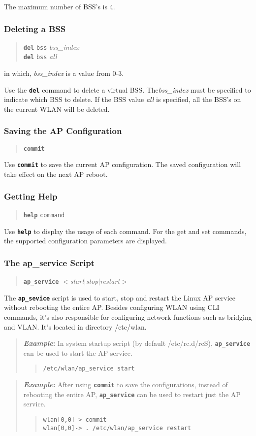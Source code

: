 \documentclass[10pt,fullpage]{article}
\newcommand{\mytt}[1]{{\texttt{#1}}}
\newcommand{\bv}{\begin{verse}}
\newcommand{\ev}{\end{verse}}
\newcommand{\clicmd}[1]{{\textbf{\texttt{#1}}}}
\newcommand{\cliparam}[1]{{\texttt{#1}}}
\newcommand{\clival}[1]{{\emph{#1}}}
\newcommand{\clidemo}[1]{{\texttt{wlan[0,0]-> #1}}}
\newenvironment{example}{\begin{quote}\textbf{\textit{Example}:}}{\end{quote}}
\begin{document}
The maximum number of BSS's is 4. 

\subsubsection{Deleting a BSS}
\bv
\clicmd{del} \cliparam{bss} \clival{bss\_index}\\
\clicmd{del} \cliparam{bss} \clival{all}
\ev
in which, \clival{bss\_index} is a value from 0-3.

Use the \clicmd{del} command to delete a virtual BSS.
The\clival{bss\_index} must be specified to indicate which BSS to
delete.  If the BSS value \clival{all} is specified, all the BSS's on
the current WLAN will be deleted.

\subsubsection{Saving the AP Configuration}
\bv
\clicmd{commit}
\ev
Use \clicmd{commit} to save the current AP configuration. 
The saved configuration will take effect on the next AP reboot.

\subsubsection{Getting Help}
\bv
\clicmd{help} \cliparam{command}
\ev
Use \clicmd{help} to display the usage of each command.  For the get
and set commands, the supported configuration parameters are
displayed.

\subsubsection{The ap\_service Script}
\bv
\clicmd{ap\_service} $<$\clival{start}$|$\clival{stop}$|$\clival{restart}$>$
\ev
The \clicmd{ap\_sevice} script is used to start, stop and restart the
Linux AP service without rebooting the entire AP. Besides configuring
WLAN using CLI commands, it's also responsible for configuring
network functions such as bridging and VLAN.
It's located in directory /etc/wlan.

\begin{example}
  In system startup script (by default /etc/rc.d/rcS), \clicmd{ap\_service}
  can be used to start the AP service.
  \bv
  \mytt{/etc/wlan/ap\_service start}
  \ev
\end{example}

\begin{example}
  After using \clicmd{commit} to save the configurations, instead of rebooting
  the entire AP, \clicmd{ap\_service} can be used to restart just the AP service.
  \bv
  \clidemo{commit}\\
  \clidemo{. /etc/wlan/ap\_service restart}
  \ev
\end{example}
\end{document}
